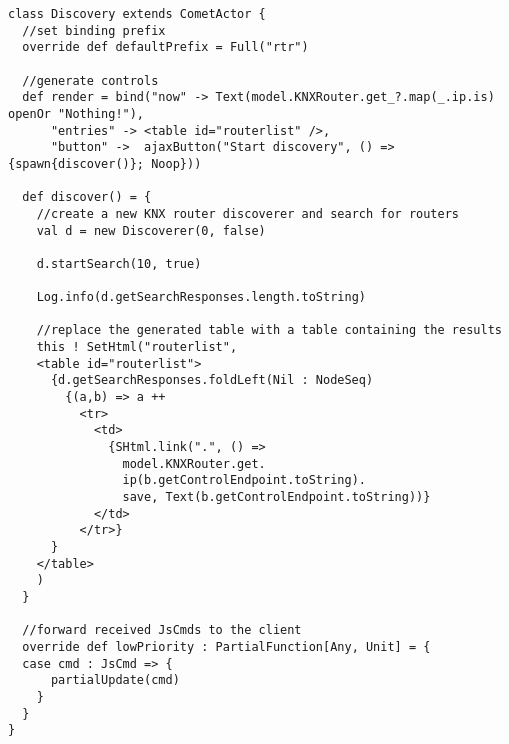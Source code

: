 \begin{lstlisting}[caption=Lift Comet: Discovery.scala,label=lst:lift:cometscala]
class Discovery extends CometActor {
  //set binding prefix
  override def defaultPrefix = Full("rtr")

  //generate controls
  def render = bind("now" -> Text(model.KNXRouter.get_?.map(_.ip.is) openOr "Nothing!"),
      "entries" -> <table id="routerlist" />,
      "button" ->  ajaxButton("Start discovery", () => {spawn{discover()}; Noop}))
      
  def discover() = {
    //create a new KNX router discoverer and search for routers
    val d = new Discoverer(0, false)
    
    d.startSearch(10, true)
    
    Log.info(d.getSearchResponses.length.toString)

    //replace the generated table with a table containing the results
    this ! SetHtml("routerlist",
    <table id="routerlist">
      {d.getSearchResponses.foldLeft(Nil : NodeSeq)
        {(a,b) => a ++
          <tr>
            <td>
              {SHtml.link(".", () =>
                model.KNXRouter.get.
                ip(b.getControlEndpoint.toString).
                save, Text(b.getControlEndpoint.toString))}
            </td>
          </tr>}
      }
    </table>
    )
  }

  //forward received JsCmds to the client
  override def lowPriority : PartialFunction[Any, Unit] = {
  case cmd : JsCmd => {
      partialUpdate(cmd)
    }
  }
}
\end{lstlisting}

